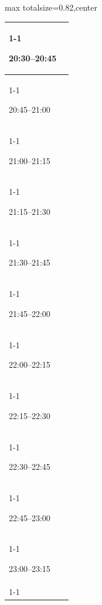 \documentclass[11pt,a4paper]{article}
\begin{document}
\begin{center}
\begin{adjustbox}{max totalsize={\textwidth}{0.82\textheight},center}
\begin{tabular}{|p{3.6cm}|p{11cm}|}
\cline{1-1}
{\centering\rule{0pt}{2.80ex}20:30--20:45} & {\centering\rule{0pt}{2.80ex}} \\
\cline{1-1}
{\centering\rule{0pt}{2.80ex}20:45--21:00} & {\centering\rule{0pt}{2.80ex}} \\
\cline{1-1}
{\centering\rule{0pt}{2.80ex}21:00--21:15} & {\centering\rule{0pt}{2.80ex}} \\
\cline{1-1}
{\centering\rule{0pt}{2.80ex}21:15--21:30} & {\centering\rule{0pt}{2.80ex}} \\
\cline{1-1}
{\centering\rule{0pt}{2.80ex}21:30--21:45} & {\centering\rule{0pt}{2.80ex}} \\
\cline{1-1}
{\centering\rule{0pt}{2.80ex}21:45--22:00} & {\centering\rule{0pt}{2.80ex}} \\
\cline{1-1}
{\centering\rule{0pt}{2.80ex}22:00--22:15} & {\centering\rule{0pt}{2.80ex}} \\
\cline{1-1}
{\centering\rule{0pt}{2.80ex}22:15--22:30} & {\centering\rule{0pt}{2.80ex}} \\
\cline{1-1}
{\centering\rule{0pt}{2.80ex}22:30--22:45} & {\centering\rule{0pt}{2.80ex}} \\
\cline{1-1}
{\centering\rule{0pt}{2.80ex}22:45--23:00} & {\centering\rule{0pt}{2.80ex}} \\
\cline{1-1}
{\centering\rule{0pt}{2.80ex}23:00--23:15} & {\centering\rule{0pt}{2.80ex}} \\
\cline{1-1}
\hline
\end{tabular}
\end{adjustbox}
\end{center}

\clearpage
\end{document}

